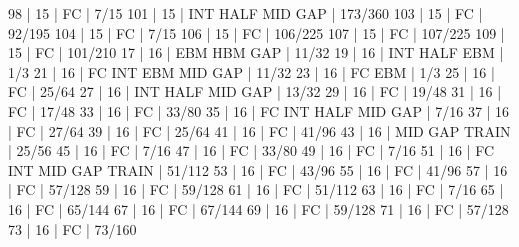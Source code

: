 98    |  15    |    FC                                        | 7/15   
101   |  15    |        INT  HALF            MID  GAP         | 173/360   
103   |  15    |    FC                                        | 92/195   
104   |  15    |    FC                                        | 7/15   
106   |  15    |    FC                                        | 106/225   
107   |  15    |    FC                                        | 107/225   
109   |  15    |    FC                                        | 101/210   
17    |  16    |                   EBM  HBM       GAP         | 11/32   
19    |  16    |        INT  HALF  EBM                        | 1/3   
21    |  16    |    FC  INT        EBM       MID  GAP         | 11/32   
23    |  16    |    FC             EBM                        | 1/3   
25    |  16    |    FC                                        | 25/64   
27    |  16    |        INT  HALF            MID  GAP         | 13/32   
29    |  16    |    FC                                        | 19/48   
31    |  16    |    FC                                        | 17/48   
33    |  16    |    FC                                        | 33/80   
35    |  16    |    FC  INT  HALF            MID  GAP         | 7/16   
37    |  16    |    FC                                        | 27/64   
39    |  16    |    FC                                        | 25/64   
41    |  16    |    FC                                        | 41/96   
43    |  16    |                             MID  GAP  TRAIN  | 25/56   
45    |  16    |    FC                                        | 7/16   
47    |  16    |    FC                                        | 33/80   
49    |  16    |    FC                                        | 7/16   
51    |  16    |    FC  INT                  MID  GAP  TRAIN  | 51/112   
53    |  16    |    FC                                        | 43/96   
55    |  16    |    FC                                        | 41/96   
57    |  16    |    FC                                        | 57/128   
59    |  16    |    FC                                        | 59/128   
61    |  16    |    FC                                        | 51/112   
63    |  16    |    FC                                        | 7/16   
65    |  16    |    FC                                        | 65/144   
67    |  16    |    FC                                        | 67/144   
69    |  16    |    FC                                        | 59/128   
71    |  16    |    FC                                        | 57/128   
73    |  16    |    FC                                        | 73/160   
